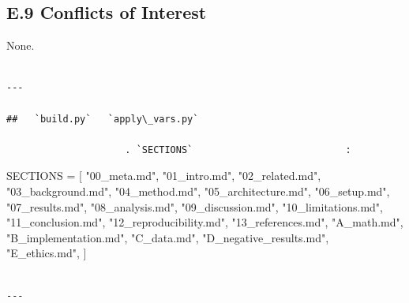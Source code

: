 \subsection{E.9 Conflicts of Interest}

None.
\begin{lstlisting}

---

##   `build.py`   `apply\_vars.py`

                     . `SECTIONS`                           :

\end{lstlisting}
SECTIONS = [
    "00\_meta.md", "01\_intro.md", "02\_related.md", "03\_background.md",
    "04\_method.md", "05\_architecture.md", "06\_setup.md", "07\_results.md",
    "08\_analysis.md", "09\_discussion.md", "10\_limitations.md",
    "11\_conclusion.md", "12\_reproducibility.md", "13\_references.md",
    "A\_math.md", "B\_implementation.md", "C\_data.md",
    "D\_negative\_results.md", "E\_ethics.md",
]
\begin{lstlisting}

---
\end{lstlisting}

